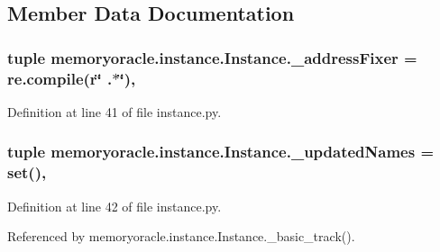 \subsection{Member Data Documentation}
\hypertarget{classmemoryoracle_1_1instance_1_1Instance_af08a37f33aa6d568f7848f1bb0641a8f}{}
\subsubsection[{\+\_\+address\+Fixer}]{\setlength{\rightskip}{0pt plus 5cm}tuple memoryoracle.\+instance.\+Instance.\+\_\+address\+Fixer = re.\+compile(r\char`\"{} .$\ast$\char`\"{})\hspace{0.3cm}{\ttfamily [static]}, {\ttfamily [private]}}\label{classmemoryoracle_1_1instance_1_1Instance_af08a37f33aa6d568f7848f1bb0641a8f}


Definition at line 41 of file instance.\+py.

\hypertarget{classmemoryoracle_1_1instance_1_1Instance_ab71e83d01ee573f7684058021dc10de3}{}
\subsubsection[{\+\_\+updated\+Names}]{\setlength{\rightskip}{0pt plus 5cm}tuple memoryoracle.\+instance.\+Instance.\+\_\+updated\+Names = set()\hspace{0.3cm}{\ttfamily [static]}, {\ttfamily [private]}}\label{classmemoryoracle_1_1instance_1_1Instance_ab71e83d01ee573f7684058021dc10de3}


Definition at line 42 of file instance.\+py.



Referenced by memoryoracle.\+instance.\+Instance.\+\_\+basic\+\_\+track().

\hypertarget{classmemoryoracle_1_1instance_1_1Instance_a8a701dbed8c8c14d7e59e94d78a559c0}{}
